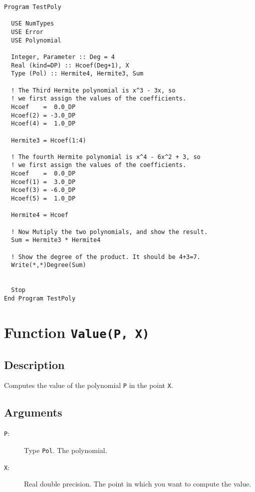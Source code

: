 \begin{lstlisting}[emph=Degree,
                   emphstyle=\color{blue},
                   frame=trBL,
                   caption=Returns the degree of a polynomial.,
                   label=degree]
Program TestPoly

  USE NumTypes
  USE Error
  USE Polynomial

  Integer, Parameter :: Deg = 4
  Real (kind=DP) :: Hcoef(Deg+1), X
  Type (Pol) :: Hermite4, Hermite3, Sum

  ! The Third Hermite polynomial is x^3 - 3x, so
  ! we first assign the values of the coefficients.
  Hcoef    =  0.0_DP
  Hcoef(2) = -3.0_DP
  Hcoef(4) =  1.0_DP

  Hermite3 = Hcoef(1:4)

  ! The fourth Hermite polynomial is x^4 - 6x^2 + 3, so
  ! we first assign the values of the coefficients.
  Hcoef    =  0.0_DP
  Hcoef(1) =  3.0_DP
  Hcoef(3) = -6.0_DP
  Hcoef(5) =  1.0_DP

  Hermite4 = Hcoef

  ! Now Mutiply the two polynomials, and show the result.
  Sum = Hermite3 * Hermite4

  ! Show the degree of the product. It should be 4+3=7.
  Write(*,*)Degree(Sum)


  Stop
End Program TestPoly
\end{lstlisting}


\section{Function \texttt{Value(P, X)}}

\subsection{Description}

Computes the value of the polynomial \texttt{P} in the point \texttt{X}.

\subsection{Arguments}

\begin{description}
\item[\texttt{P}:] Type \texttt{Pol}. The polynomial.
\item[\texttt{X}:] Real double precision. The point in which you want
  to compute the value.
\end{description}

